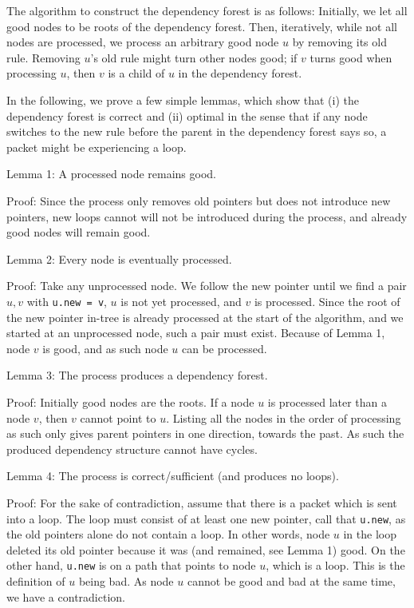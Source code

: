The algorithm to construct the dependency forest is as follows: Initially, we let all good nodes to be roots of the dependency forest. Then, iteratively, while not all nodes are processed, we process an arbitrary good node $u$ by removing its old rule. Removing $u$'s old rule might turn other nodes good; if $v$ turns good when processing $u$, then $v$ is a child of $u$ in the dependency forest.

In the following, we prove a few simple lemmas, which show that (i) the dependency forest is correct and (ii) optimal in the sense that if any node switches to the new rule before the parent in the dependency forest says so, a packet might be experiencing a loop.

Lemma 1: A processed node remains good.

Proof: Since the process only removes old pointers but does not introduce new pointers, new loops cannot will not be introduced during the process, and already good nodes will remain good.

Lemma 2: Every node is eventually processed.

Proof: Take any unprocessed node. We follow the new pointer until we find a pair $u,v$ with \texttt{u.new = v}, $u$ is not yet processed, and $v$ is processed. Since the root of the new pointer in-tree is already processed at the start of the algorithm, and we started at an unprocessed node, such a pair must exist. Because of Lemma 1, node $v$ is good, and as such node $u$ can be processed.

Lemma 3: The process produces a dependency forest.

Proof: Initially good nodes are the roots. If a node $u$ is processed later than a node $v$, then $v$ cannot point to $u$. Listing all the nodes in the order of processing as such only gives parent pointers in one direction, towards the past. As such the produced dependency structure cannot have cycles.

Lemma 4: The process is correct/sufficient (and produces no loops).

Proof: For the sake of contradiction, assume that there is a packet which is sent into a loop. The loop must consist of at least one new pointer, call that \texttt{u.new}, as the old pointers alone do not contain a loop. In other words, node $u$ in the loop deleted its old pointer because it was (and remained, see Lemma 1) good. On the other hand, \texttt{u.new} is on a path that points to node $u$, which is a loop. This is the definition of $u$ being bad. As node $u$ cannot be good and bad at the same time, we have a contradiction.

